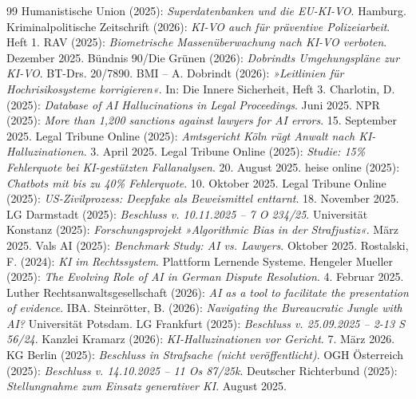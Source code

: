 \documentclass[12pt,a4paper]{article}
\begin{document}
\begin{thebibliography}{99}
		 Humanistische Union (2025): \emph{Superdatenbanken und die EU-KI-VO}. Hamburg.
		 Kriminalpolitische Zeitschrift (2026): \emph{KI-VO auch für präventive Polizeiarbeit}. Heft 1.
		 RAV (2025): \emph{Biometrische Massenüberwachung nach KI-VO verboten}. Dezember 2025.
		 Bündnis 90/Die Grünen (2026): \emph{Dobrindts Umgehungspläne zur KI-VO}. BT-Drs. 20/7890.
		 BMI – A. Dobrindt (2026): \emph{»Leitlinien für Hochrisikosysteme korrigieren«}. In: Die Innere Sicherheit, Heft 3.
		 Charlotin, D. (2025): \emph{Database of AI Hallucinations in Legal Proceedings}. Juni 2025.
		 NPR (2025): \emph{More than 1,200 sanctions against lawyers for AI errors}. 15. September 2025.
		 Legal Tribune Online (2025): \emph{Amtsgericht Köln rügt Anwalt nach KI-Halluzinationen}. 3. April 2025.
		 Legal Tribune Online (2025): \emph{Studie: 15\% Fehlerquote bei KI-gestützten Fallanalysen}. 20. August 2025.
		 heise online (2025): \emph{Chatbots mit bis zu 40\% Fehlerquote}. 10. Oktober 2025.
		 Legal Tribune Online (2025): \emph{US-Zivilprozess: Deepfake als Beweismittel enttarnt}. 18. November 2025.
		 LG Darmstadt (2025): \emph{Beschluss v. 10.11.2025 – 7 O 234/25}.
		 Universität Konstanz (2025): \emph{Forschungsprojekt »Algorithmic Bias in der Strafjustiz«}. März 2025.
		 Vals AI (2025): \emph{Benchmark Study: AI vs. Lawyers}. Oktober 2025.
		 Rostalski, F. (2024): \emph{KI im Rechtssystem}. Plattform Lernende Systeme.
		 Hengeler Mueller (2025): \emph{The Evolving Role of AI in German Dispute Resolution}. 4. Februar 2025.
		 Luther Rechtsanwaltsgesellschaft (2026): \emph{AI as a tool to facilitate the presentation of evidence}. IBA.
		 Steinrötter, B. (2026): \emph{Navigating the Bureaucratic Jungle with AI?} Universität Potsdam.
		 LG Frankfurt (2025): \emph{Beschluss v. 25.09.2025 – 2-13 S 56/24}.
		 Kanzlei Kramarz (2026): \emph{KI-Halluzinationen vor Gericht}. 7. März 2026.
		 KG Berlin (2025): \emph{Beschluss in Strafsache (nicht veröffentlicht)}.
		 OGH Österreich (2025): \emph{Beschluss v. 14.10.2025 – 11 Os 87/25k}.
		 Deutscher Richterbund (2025): \emph{Stellungnahme zum Einsatz generativer KI}. August 2025.

\end{thebibliography}
\end{document}

